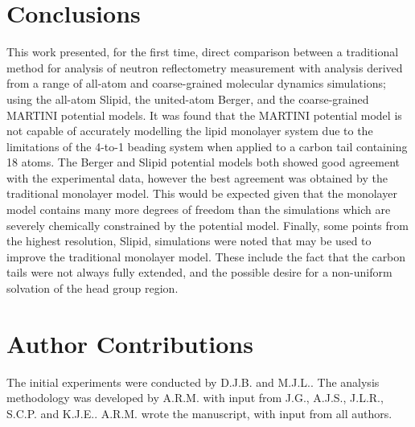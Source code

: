 \documentclass[amsmath,amssymb,twocolumn,superscriptaddress]{revtex4-1}
\begin{document}
\section{Conclusions}
This work presented, for the first time, direct comparison between a traditional method for analysis of neutron reflectometry measurement with analysis derived from a range of all-atom and coarse-grained molecular dynamics simulations; using the all-atom Slipid, the united-atom Berger, and the coarse-grained MARTINI potential models.
It was found that the MARTINI potential model is not capable of accurately modelling the lipid monolayer system due to the limitations of the 4-to-1 beading system when applied to a carbon tail containing 18 atoms.
The Berger and Slipid potential models both showed good agreement with the experimental data, however the best agreement was obtained by the traditional monolayer model.
This would be expected given that the monolayer model contains many more degrees of freedom than the simulations which are severely chemically constrained by the potential model.
Finally, some points from the highest resolution, Slipid, simulations were noted that may be used to improve the traditional monolayer model.
These include the fact that the carbon tails were not always fully extended, and the possible desire for a non-uniform solvation of the head group region.

\section{Author Contributions}
The initial experiments were conducted by D.J.B. and M.J.L..
The analysis methodology was developed by A.R.M. with input from J.G., A.J.S., J.L.R., S.C.P. and K.J.E..
A.R.M. wrote the manuscript, with input from all authors.



\end{document}
